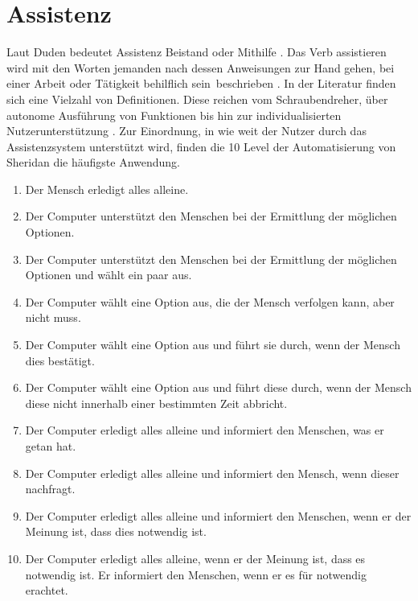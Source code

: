 \section{Assistenz}
Laut Duden bedeutet Assistenz Beistand oder Mithilfe \cite{DudenAssistenz}. Das Verb assistieren wird mit den Worten \glqq jemanden nach dessen Anweisungen zur Hand gehen, bei einer Arbeit oder Tätigkeit behilflich sein\grqq \ beschrieben \cite{DudenAssistieren}. In der Literatur finden sich eine Vielzahl von Definitionen. Diese reichen vom Schraubendreher, über autonome Ausführung von Funktionen bis hin zur individualisierten Nutzerunterstützung \cite{Ludwig}. Zur Einordnung, in wie weit der Nutzer durch das Assistenzsystem unterstützt wird, finden die 10 Level der Automatisierung von Sheridan \cite{Wandke2005} die häufigste Anwendung.
\begin{enumerate}
\item Der Mensch erledigt alles alleine.
\item Der Computer unterstützt den Menschen bei der Ermittlung der möglichen Optionen.
\item Der Computer unterstützt den Menschen bei der Ermittlung der möglichen Optionen und wählt ein paar aus.
\item Der Computer wählt eine Option aus, die der Mensch verfolgen kann, aber nicht muss.
\item Der Computer wählt eine Option aus und führt sie durch, wenn der Mensch dies bestätigt.
\item Der Computer wählt eine Option aus und führt diese durch, wenn der Mensch diese nicht innerhalb einer bestimmten Zeit abbricht.
\item Der Computer erledigt alles alleine und informiert den Menschen, was er getan hat.
\item Der Computer erledigt alles alleine und informiert den Mensch, wenn dieser nachfragt.
\item Der Computer erledigt alles alleine und informiert den Menschen, wenn er der Meinung ist, dass dies notwendig ist.
\item Der Computer erledigt alles alleine, wenn er der Meinung ist, dass es notwendig ist. Er informiert den Menschen, wenn er es für notwendig erachtet.
\end{enumerate}

